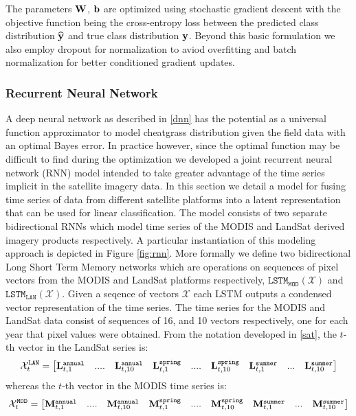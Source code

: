 \documentclass{article} %
\begin{document}
The parameters ${\bf W}$, ${\bf b}$ are optimized using stochastic gradient descent with the objective function being the cross-entropy loss between the predicted class distribution $\widehat{{\bf y}}$ and true class distribution ${\bf y}$. Beyond this basic formulation we also employ dropout for normalization to aviod overfitting and batch normalization for better conditioned gradient updates. 
\subsubsection{Recurrent Neural Network}
A deep neural network as described in \ref{dnn} has the potential as a universal function approximator to model cheatgrass distribution given the field data with an optimal Bayes error. In practice however, since the optimal function may be difficult to find during the optimization we developed a joint recurrent neural network (RNN) model intended to take greater advantage of the time series implicit in the satellite imagery data. In this section we detail a model for fusing time series of data from different satellite platforms into a latent representation that can be used for linear classification. The model consists of two separate bidirectional RNNs which model time series of the MODIS and LandSat derived imagery products respectively. 
A particular instantiation of this modeling approach is depicted in Figure \ref{fig:rnn}. More formally we define two bidirectional Long Short Term Memory networks  which are operations on sequences of pixel vectors from the MODIS and LandSat platforms respectively,  $\texttt{LSTM}_{\texttt{MOD}}(\mathcal{X})$ and  $\texttt{LSTM}_{\texttt{LAN}}(\mathcal{X})$. Given a seqence of vectors $\mathcal{X}$ each LSTM outputs a condensed vector representation of the time series. The time series for the MODIS and LandSat data consist of sequences of 16, and 10 vectors respectively, one for each year that pixel values were obtained. From the notation developed in \ref{sat}, the $t$-th vector in the LandSat series is:
\begin{equation}{\bf \mathcal{X}}^{\texttt{LAN}}_{t} =
\begin{bmatrix}{\bf L}^{\texttt{annual}}_{t,1}& ....& {\bf L}^{\texttt{annual}}_{t,10}&{\bf L}^{\texttt{spring}}_{t,1}& ....& {\bf L}^{\texttt{spring}}_{t,10}& {\bf L}^{\texttt{summer}}_{t,1}& ...& {\bf L}^{\texttt{summer}}_{t,10}\end{bmatrix}
\end{equation}
whereas the $t$-th vector in the MODIS time series is:
\begin{equation}{\bf \mathcal{X}}^{\texttt{MOD}}_{t} =
\begin{bmatrix}{\bf M}^{\texttt{annual}}_{t,1}& ....& {\bf M}^{\texttt{annual}}_{t,10}&{\bf M}^{\texttt{spring}}_{t,1}& ....& {\bf M}^{\texttt{spring}}_{t,10}& {\bf M}^{\texttt{summer}}_{t,1}& ...& {\bf M}^{\texttt{summer}}_{t,10}\end{bmatrix}
\end{equation}
\end{document}
